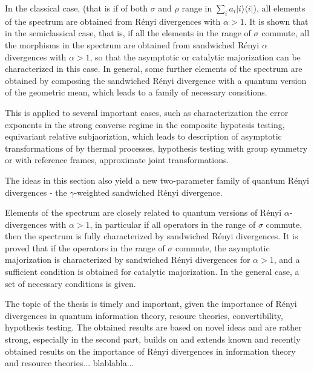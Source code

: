 \documentclass[12pt]{article}
\begin{document}
In the classical  case, (that is if of both $\sigma$ and $\rho$ range in $\sum_i
a_i|i\rangle\langle i|$), all elements of the spectrum are obtained from R\'enyi
divergences with $\alpha>1$. It is shown that in the semiclassical case, that is, if all
the elements in the range of $\sigma$ commute, all the morphisms in the spectrum are
obtained from sandwiched R\'enyi $\alpha$ divergences with $\alpha>1$, so that the
asymptotic or catalytic majorization can be characterized in this case. 
In general, some further elements of the spectrum are obtained by composing the sandwiched
R\'enyi divergence with a quantum version of the geometric mean, which leads to a family
of necessary consitions.

This is applied to several important cases, such as characterization the error exponents
in the strong converse regime in the composite hypotesis testing, equivariant relative
subjaoriztion, which leads to description of asymptotic transformations of by thermal
processes, hypothesis testing with group symmetry or with reference frames, approximate
joint transformations. 

The ideas in this section also yield a new two-parameter family of quantum R\'enyi
divergences - the $\gamma$-weighted sandwiched R\'enyi divergence.






Elements of the spectrum are closely related to quantum versions of R\'enyi
$\alpha$-divergences with $\alpha>1$, in particular if all operators in the range of
$\sigma$ commute, then the spectrum is fully characterized by sandwiched R\'enyi
divergences. It is proved that if the operators in the range of $\sigma$ commute, the 
asymptotic majorization is characterized by sandwiched R\'enyi divergences for $\alpha>1$,
and a sufficient condition is obtained for catalytic majorization. 
In the general case, a set of necessary conditions is given. 




The topic of the thesis is timely and important, given the importance of R\'enyi
divergences in quantum information theory, resoure theories, convertibility, hypothesis
testing. The obtained results are based on novel ideas and are rather strong, especially
in the second part, builds on and extends known and recently obtained results on the
importance of R\'enyi divergences in information theory and resource theories...
blablabla...
\end{document}
